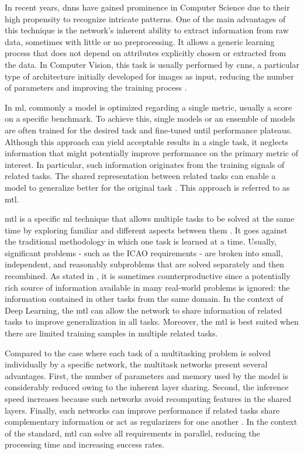 In recent years, \acfp{dnn} have gained prominence in Computer Science due to their high propensity to recognize intricate patterns. One of the main advantages of this technique is the network's inherent ability to extract information from raw data, sometimes with little or no preprocessing. It allows a generic learning process that does not depend on attributes explicitly chosen or extracted from the data. In Computer Vision, this task is usually performed by \acfp{cnn}, a particular type of architecture initially developed for images as input, reducing the number of parameters and improving the training process \citep{goodfellow2016deep}.
 
In \acf{ml}, commonly a model is optimized regarding a single metric, usually a score on a specific benchmark. To achieve this, single models or an ensemble of models are often trained for the desired task and fine-tuned until performance plateaus. Although this approach can yield acceptable results in a single task, it neglects information that might potentially improve performance on the primary metric of interest. In particular, such information originates from the training signals of related tasks. The shared representation between related tasks can enable a model to generalize better for the original task \citep{ruder2017overview}. This approach is referred to as \acf{mtl}.
 
\acl{mtl} is a specific \acl{ml} technique that allows multiple tasks to be solved at the same time by exploring familiar and different aspects between them \citep{zhang2017survey}. It goes against the traditional methodology in which one task is learned at a time. Usually, significant problems - such as the ICAO requirements - are broken into small, independent, and reasonably subproblems that are solved separately and then recombined. As stated in \cite{Caruana1997}, it is sometimes counterproductive since a potentially rich source of information available in many real-world problems is ignored: the information contained in other tasks from the same domain. In the context of Deep Learning, the \acs{mtl} can allow the network to share information of related tasks to improve generalization in all tasks. Moreover, the \acl{mtl} is best suited when there are limited training samples in multiple related tasks.
 
Compared to the case where each task of a multitasking problem is solved individually by a specific network, the multitask networks present several advantages. First, the number of parameters and memory used by the model is considerably reduced owing to the inherent layer sharing. Second, the inference speed increases because such networks avoid recomputing features in the shared layers. Finally, such networks can improve performance if related tasks share complementary information or act as regularizers for one another \citep{vandenhende2021multi}. In the context of the \icao standard, \acs{mtl} can solve all requirements in parallel, reducing the processing time and increasing success rates.
 

